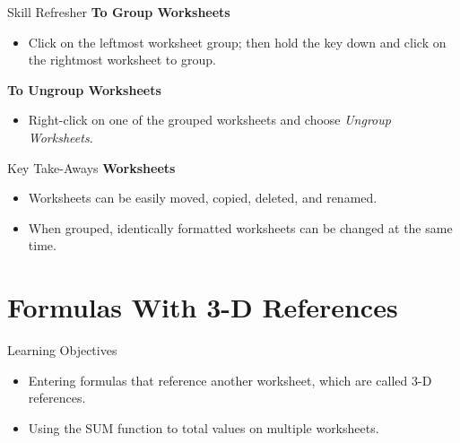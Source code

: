 \begin{center}
	\begin{sklbox}{Skill Refresher}
		\textbf{To Group Worksheets}
		\\
		\begin{itemize}
			\setlength{\itemsep}{0pt}
			\setlength{\parskip}{0pt}
			\setlength{\parsep}{0pt}
			
			\item Click on the leftmost worksheet group; then hold the  key down and click on the rightmost worksheet to group.
		\end{itemize}
			
		\bigskip
			
		\textbf{To Ungroup Worksheets}
		\begin{itemize}
			\setlength{\itemsep}{0pt}
			\setlength{\parskip}{0pt}
			\setlength{\parsep}{0pt}
			
			\item Right-click on one of the grouped worksheets and choose \textit{Ungroup Worksheets}.
		\end{itemize}
	\end{sklbox}
\end{center}

\begin{center}
	\begin{tkwbox}{Key Take-Aways}
		\textbf{Worksheets}
		\\
		\begin{itemize}
			\setlength{\itemsep}{0pt}
			\setlength{\parskip}{0pt}
			\setlength{\parsep}{0pt}
			
			\item Worksheets can be easily moved, copied, deleted, and renamed.
			\item When grouped, identically formatted worksheets can be changed at the same time.
			
		\end{itemize}
	\end{tkwbox}
\end{center}

\section{Formulas With 3-D References}

\begin{center}
	\begin{objbox}{Learning Objectives}
		\begin{itemize}
			\setlength{\itemsep}{0pt}
			\setlength{\parskip}{0pt}
			\setlength{\parsep}{0pt}

			\item Entering formulas that reference another worksheet, which are called $ 3 $-D references.
			\item Using the SUM function to total values on multiple worksheets.
			
		\end{itemize}
	\end{objbox}
\end{center}

